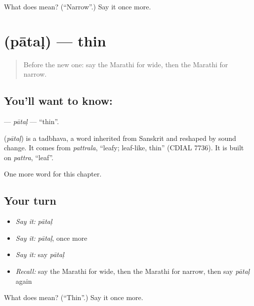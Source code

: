 \begin{tcolorbox}[breakable,colback=teal!4,colframe=teal!35!black,title={Before you move on}]
What does  mean? (\textquotedblleft{}Narrow\textquotedblright{}.) Say it once more.
\end{tcolorbox}
\section[\texorpdfstring{\mr{पातळ} (pātaḷ)}{पातळ (pātaḷ)}]{ (pātaḷ) — thin}

\label{lesson:MR-C147-patal}



\begin{quote}
Before the new one: say the Marathi for wide, then the Marathi for narrow.
\end{quote}

\subsection*{You'll want to know: }
\textbf{} — \emph{pātaḷ} — \textquotedblleft{}thin\textquotedblright{}.

\begin{cousinweb}
\textbf{} (\emph{pātaḷ}) is a tadbhava, a word inherited from Sanskrit and reshaped by sound change. It comes from \emph{pattrala}, \textquotedblleft{}leafy; leaf-like, thin\textquotedblright{} (CDIAL 7736). It is built on \emph{pattra}, \textquotedblleft{}leaf\textquotedblright{}.
\end{cousinweb}

\begin{grammarlens}[title={What you've built}]
One more word for this chapter.
\end{grammarlens}

\subsection*{Your turn}
\begin{itemize}
\raggedright
  \item \emph{Say it:} \emph{pātaḷ}
  \item \emph{Say it:} \emph{pātaḷ}, once more
  \item \emph{Say it:} say \emph{pātaḷ}
  \item \emph{Recall:} say the Marathi for wide, then the Marathi for narrow, then say \emph{pātaḷ} again
\end{itemize}

\begin{tcolorbox}[breakable,colback=teal!4,colframe=teal!35!black,title={Before you move on}]
What does  mean? (\textquotedblleft{}Thin\textquotedblright{}.) Say it once more.
\end{tcolorbox}
